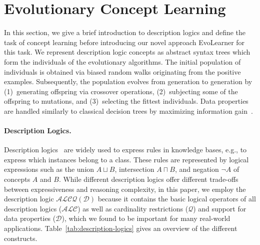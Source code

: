 \section{Evolutionary Concept Learning}%
\label{sec:approach}

In this section, we give a brief introduction to description logics and define the task of concept learning before introducing our novel approach EvoLearner for this task. We represent description logic concepts as abstract syntax trees which form the individuals of the evolutionary algorithms. The initial population of individuals is obtained via biased random walks originating from the positive examples. Subsequently, the population evolves from generation to generation by (1)~generating offspring via crossover operations, (2)~subjecting some of the offspring to mutations, and (3)~selecting the fittest individuals. Data properties are handled similarly to classical decision trees by maximizing information gain~\citep{Quinlan1986Induction}.



\paragraph{Description Logics.}

Description logics~\cite{Kroetzsch2012Description} are widely used to express rules in knowledge bases, e.g., to express which instances belong to a class. These rules are represented by logical expressions such as the union $A \sqcup B$, intersection $A \sqcap B$, and negation $\neg A$ of concepts $A$ and $B$. While different description logics offer different trade-offs between expressiveness and reasoning complexity, in this paper, we employ the description logic $\mathcal{ALCQ(D)}$ because it contains the basic logical operators of all description logics ($\mathcal{ALC}$) as well as cardinality restrictions ($\mathcal{Q}$) and support for data properties ($\mathcal{D}$), which we found to be important for many real-world applications. Table~\ref{tab:description-logics} gives an overview of the different constructs.

